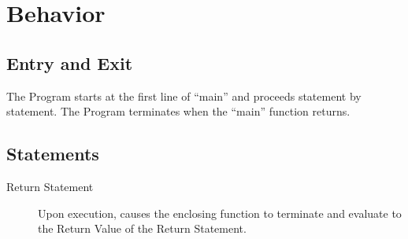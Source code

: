 \documentclass{article}
\begin{document}
\section{Behavior}
	\subsection{Entry and Exit} The Program starts at the first line of ``main'' and proceeds statement by statement. The Program terminates when the ``main'' function returns.
	\subsection{Statements}
		\begin{description}
		\item[Return Statement] Upon execution, causes the enclosing function to terminate and evaluate to the Return Value of the Return Statement.
		\end{description}
\end{document}
